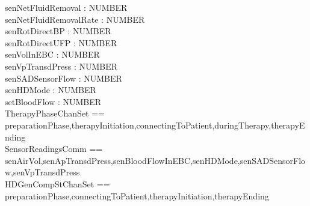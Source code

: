 \begin{circus}
\circchannel senNetFluidRemoval : NUMBER\\
\circchannel senNetFluidRemovalRate : NUMBER\\
\circchannel senRotDirectBP : NUMBER\\
\circchannel senRotDirectUFP : NUMBER\\
\circchannel senVolInEBC : NUMBER\\
\circchannel senVpTransdPress : NUMBER\\
\circchannel senSADSensorFlow : NUMBER\\
\circchannel senHDMode : NUMBER\\
\circchannel setBloodFlow : NUMBER\\
\circchannelset TherapyPhaseChanSet == \lchanset preparationPhase,therapyInitiation,connectingToPatient,duringTherapy,therapyEnding \rchanset\\
\circchannelset SensorReadingsComm == \lchanset senAirVol,senApTransdPress,senBloodFlowInEBC,senHDMode,senSADSensorFlow,senVpTransdPress \rchanset\\
\circchannelset HDGenCompStChanSet == \lchanset preparationPhase,connectingToPatient,therapyInitiation,therapyEnding \rchanset\\
\end{circus}

